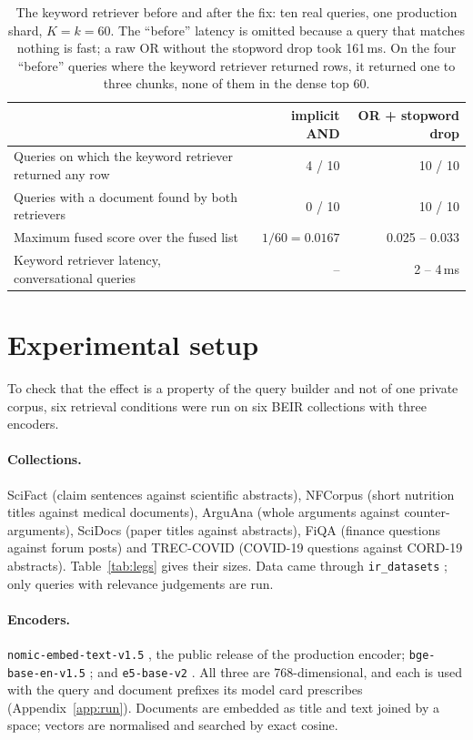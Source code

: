 \documentclass[11pt]{article}
\begin{document}
\begin{table}[h]
\centering
\small
\begin{tabular}{lrr}
\toprule
 & implicit AND & OR + stopword drop \\
\midrule
Queries on which the keyword retriever returned any row & 4 / 10 & 10 / 10 \\
Queries with a document found by both retrievers & 0 / 10 & 10 / 10 \\
Maximum fused score over the fused list & $1/60 = 0.0167$ & 0.025 -- 0.033 \\
Keyword retriever latency, conversational queries & -- & 2 -- 4\,ms \\
\bottomrule
\end{tabular}
\caption{The keyword retriever before and after the fix: ten real queries, one production shard, $K = k = 60$. The ``before'' latency is omitted because a query that matches nothing is fast; a raw OR without the stopword drop took 161\,ms. On the four ``before'' queries where the keyword retriever returned rows, it returned one to three chunks, none of them in the dense top 60.}
\label{tab:prod}
\end{table}

\section{Experimental setup}
\label{sec:setup}

To check that the effect is a property of the query builder and not of one private corpus, six retrieval conditions were run on six BEIR collections \citep{thakur2021beir} with three encoders.

\paragraph{Collections.} SciFact \citep{wadden2020scifact} (claim sentences against scientific abstracts), NFCorpus \citep{boteva2016nfcorpus} (short nutrition titles against medical documents), ArguAna \citep{wachsmuth2018arguana} (whole arguments against counter-arguments), SciDocs \citep{cohan2020specter} (paper titles against abstracts), FiQA \citep{maia2018fiqa} (finance questions against forum posts) and TREC-COVID \citep{voorhees2020treccovid} (COVID-19 questions against CORD-19 abstracts). Table~\ref{tab:legs} gives their sizes. Data came through \texttt{ir\_datasets} \citep{macavaney2021irdatasets}; only queries with relevance judgements are run.

{\sloppy
\paragraph{Encoders.} \texttt{nomic-embed-text-v1.5} \citep{nussbaum2024nomic}, the public release of the production encoder; \texttt{bge-base-en-v1.5} \citep{xiao2023cpack}; and \texttt{e5-base-v2} \citep{wang2022e5}. All three are 768-dimensional, and each is used with the query and document prefixes its model card prescribes (Appendix~\ref{app:run}). Documents are embedded as title and text joined by a space; vectors are normalised and searched by exact cosine.\par}
\end{document}
